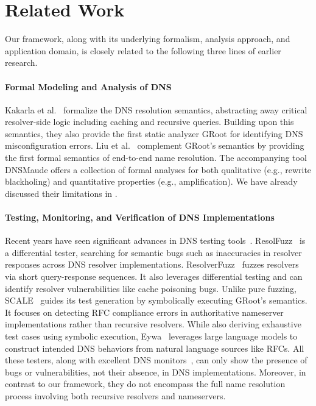 \section{Related Work} 
\label{sec:related}

Our framework, along with its underlying formalism, analysis approach, and application domain, is closely related to the following three lines of  earlier research.

\paragraph{Formal Modeling and Analysis of DNS}
Kakarla et al.~\cite{groot} formalize the DNS resolution semantics, abstracting away critical resolver-side logic including caching and recursive queries. 
Building upon this semantics, they also 
provide the first static analyzer GRoot for identifying DNS misconfiguration errors. 
Liu et al.~\cite{dnsmaude} complement GRoot's semantics by
providing the first formal 
semantics of end-to-end name resolution.
The accompanying tool DNSMaude
offers a collection of formal analyses for both qualitative (e.g., rewrite blackholing)
and quantitative 
properties (e.g., amplification).
We have already discussed
their limitations in . 




\paragraph{Testing, Monitoring, and Verification of DNS Implementations} 
Recent years have seen significant advances in DNS testing tools~\cite{Eywa,ResolFuzz,ResolverFuzz,scale}. 
ResolFuzz~\cite{ResolFuzz} is a differential tester, searching for semantic
bugs such as inaccuracies in resolver responses across DNS resolver implementations.
ResolverFuzz~\cite{ResolverFuzz} fuzzes resolvers via
 short query-response sequences. 
 It also leverages differential testing and can identify resolver vulnerabilities like cache poisoning bugs.
Unlike pure fuzzing,
SCALE~\cite{scale}
guides its test generation by  
symbolically executing GRoot's  semantics. 
It focuses on detecting RFC compliance errors in authoritative nameserver implementations rather than recursive resolvers.
While also deriving exhaustive test cases using symbolic execution, Eywa~\cite{Eywa} leverages large language models to construct intended DNS behaviors from natural language sources like RFCs. 
All these testers, along with excellent DNS monitors~\cite{thousandeyes,check-host}, 
can only show the presence of bugs or vulnerabilities, not their absence, in DNS implementations.
Moreover, in contrast to our framework, they
do not
encompass the full name resolution process involving both  recursive resolvers and nameservers.


